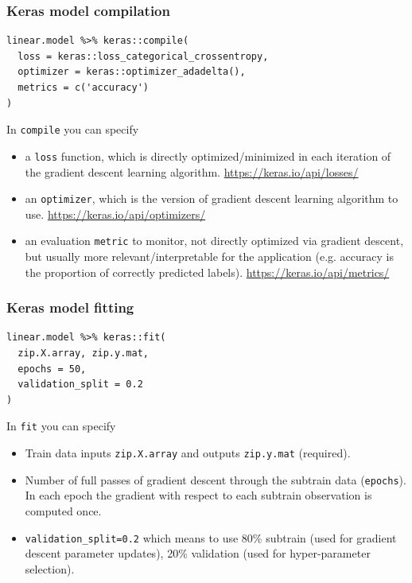 \documentclass{beamer}
\begin{document}
\begin{frame}[fragile]
\frametitle{Keras model compilation}
\begin{verbatim}
linear.model %>% keras::compile(
  loss = keras::loss_categorical_crossentropy,
  optimizer = keras::optimizer_adadelta(),
  metrics = c('accuracy')
)
\end{verbatim}
In \texttt{compile} you can specify
\begin{itemize}
\item a \texttt{loss} function, which is directly optimized/minimized
  in each iteration of the gradient descent learning algorithm. 
  \url{https://keras.io/api/losses/} 
\item an \texttt{optimizer}, which is the version of gradient descent
  learning algorithm to use. 
  \url{https://keras.io/api/optimizers/} 
\item an evaluation \texttt{metric} to monitor, not directly optimized
  via gradient descent, but usually more relevant/interpretable for
  the application (e.g. accuracy is the proportion of correctly
  predicted labels). \url{https://keras.io/api/metrics/} 
\end{itemize}
\end{frame}
 
\begin{frame}[fragile]
\frametitle{Keras model fitting}
\begin{verbatim}
linear.model %>% keras::fit(
  zip.X.array, zip.y.mat,
  epochs = 50,
  validation_split = 0.2
)
\end{verbatim}
In \texttt{fit} you can specify
\begin{itemize}
\item Train data inputs \texttt{zip.X.array} and outputs
  \texttt{zip.y.mat} (required).
\item Number of full passes of gradient descent through the subtrain
  data (\texttt{epochs}). In each epoch the gradient with respect to
  each subtrain observation is computed once.
\item \texttt{validation\_split=0.2} which means to use 80\% subtrain
  (used for gradient descent parameter updates), 20\% validation (used
  for hyper-parameter selection). 
\end{itemize}
\end{frame}
 
\end{document}

